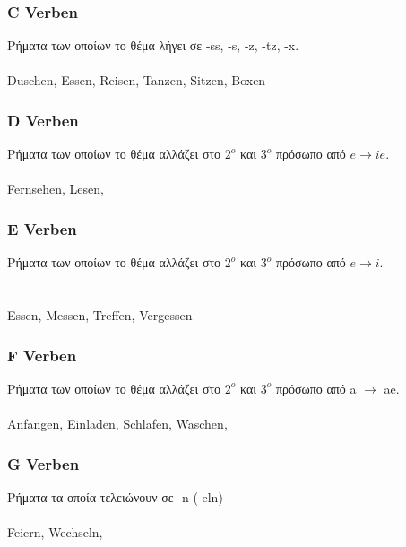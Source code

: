 \begin{appendix}
 \subsubsection{C Verben}
 Ρήματα των οποίων το θέμα λήγει σε -ss, -s, -z, -tz, -x. \\
  \\ \newline
 \gls{Duschen}, \gls{Essen}, \gls{Reisen}, \gls{Tanzen}, \gls{Sitzen}, \gls{Boxen}
 \subsubsection{D Verben}
 Ρήματα των οποίων το θέμα αλλάζει στο $2^o$ και $3^ο$ πρόσωπο από $e \rightarrow ie$. \\
  \\
 
 \gls{Fernsehen}, \gls{Lesen}, 
 
 \subsubsection{E Verben}
 Ρήματα των οποίων το θέμα αλλάζει στο $2^o$ και $3^ο$ πρόσωπο από $e \rightarrow i$. \\
  \\
  \\
 
 \gls{Essen}, \gls{Messen}, \gls{Treffen}, \gls{Vergessen}
 
 \subsubsection{F Verben}
 Ρήματα των οποίων το θέμα αλλάζει στο $2^o$ και $3^ο$ πρόσωπο από a $\rightarrow$ ae. \\
  \\
 
 \gls{Anfangen}, \gls{Einladen}, \gls{Schlafen}, \gls{Waschen}, 
 
 \subsubsection{G Verben}
 Ρήματα τα οποία τελειώνουν σε -n (-eln) \\
  \\
 \gls{Feiern}, \gls{Wechseln}, 
 

\end{appendix}
